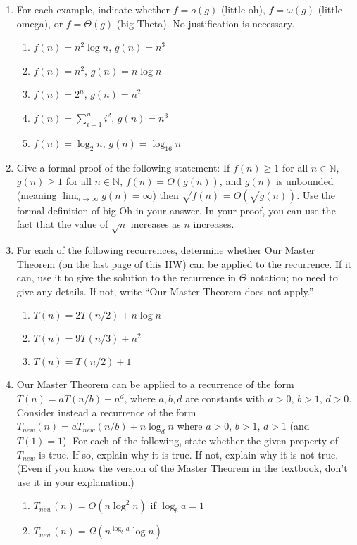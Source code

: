 \documentclass{article}
\begin{document}
\begin{enumerate}
    \item For each example, indicate whether $f = o(g)$ (little-oh), $f = \omega(g)$ (little-omega), or $f = \Theta(g)$ (big-Theta). No justification is necessary.
    \begin{enumerate}
        \item $f(n) = n^2 \log n$, $g(n) = n^3$
        \item $f(n) = n^2$, $g(n) = n \log n$
        \item $f(n) = 2^n$, $g(n) = n^2$
        \item $f(n) = \sum_{i=1}^n i^2$, $g(n) = n^3$
        \item $f(n) = \log_2 n$, $g(n) = \log_{16} n$
    \end{enumerate}

    \item Give a formal proof of the following statement: If $f(n) \ge 1$ for all $n \in \mathbb{N}$, $g(n) \ge 1$ for all $n \in \mathbb{N}$, $f(n) = O(g(n))$, and $g(n)$ is unbounded (meaning $\lim_{n \to \infty} g(n) = \infty$) then $\sqrt{f(n)} = O(\sqrt{g(n)})$. Use the formal definition of big-Oh in your answer. In your proof, you can use the fact that the value of $\sqrt{n}$ increases as $n$ increases.

    \item For each of the following recurrences, determine whether Our Master Theorem (on the last page of this HW) can be applied to the recurrence. If it can, use it to give the solution to the recurrence in $\Theta$ notation; no need to give any details. If not, write “Our Master Theorem does not apply.”
    \begin{enumerate}
        \item $T(n) = 2T(n/2) + n \log n$
        \item $T(n) = 9T(n/3) + n^2$
        \item $T(n) = T(n/2) + 1$
    \end{enumerate}

    \item Our Master Theorem can be applied to a recurrence of the form $T(n) = aT(n/b) + n^d$, where $a, b, d$ are constants with $a > 0$, $b > 1$, $d > 0$. Consider instead a recurrence of the form $T_{new}(n) = aT_{new}(n/b) + n \log_d n$ where $a > 0$, $b > 1$, $d > 1$ (and $T(1) = 1$). For each of the following, state whether the given property of $T_{new}$ is true. If so, explain why it is true. If not, explain why it is not true. (Even if you know the version of the Master Theorem in the textbook, don’t use it in your explanation.)
    \begin{enumerate}
        \item $T_{new}(n) = O(n \log^2 n)$ if $\log_b a = 1$
        \item $T_{new}(n) = \Omega(n^{\log_b a} \log n)$
    \end{enumerate}


\end{enumerate}
\end{document}
